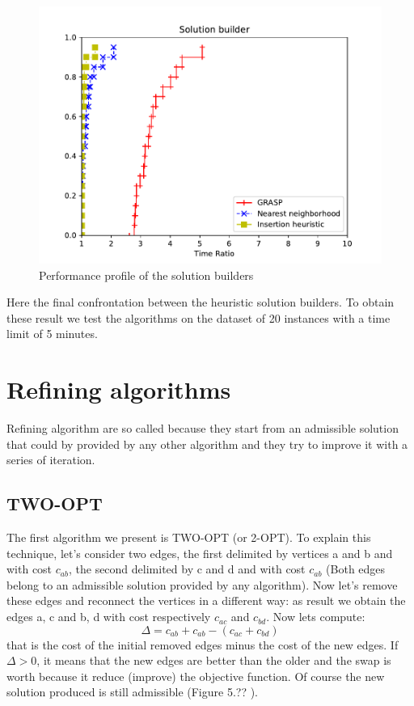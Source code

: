 \begin{figure}[h!]
	\centering
	\includegraphics[scale=1]{media/builder.pdf}
	\caption{Performance profile of the solution builders}
\end{figure}

Here the final confrontation between the heuristic solution builders. To obtain these result we test the algorithms on the dataset of 20 instances with a time limit of 5 minutes. 

\newpage

\section{Refining algorithms}
Refining algorithm are so called because they start from an admissible solution that could by provided by any other algorithm and they try to improve it with a series of iteration.

\subsection{TWO-OPT}
The first algorithm we present is TWO-OPT (or 2-OPT). To explain this technique, let's consider two edges, the first delimited by vertices a and b and with cost $c_{ab}$, the second delimited by c and d and with cost $c_{ab}$ (Both edges belong to an admissible solution provided by any algorithm). Now let's remove these edges and reconnect the vertices in a different way: as result we obtain the edges a, c and b, d with cost respectively $c_{ac}$ and $c_{bd}$. Now lets compute: 
\begin{equation*}
\Delta = c_{ab} + c_{ab} - (c_{ac} + c_{bd})
\end{equation*}
that is the cost of the initial removed edges minus the cost of the new edges. If $\Delta > 0$, it means that the new edges are better than the older and the swap is worth because it reduce (improve) the objective function. Of course the new solution produced is still admissible (Figure 5.?? %
).\\


